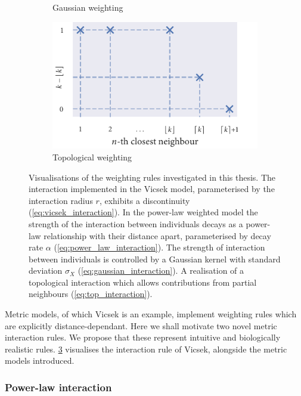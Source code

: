 \begin{figure}[tb]
\begin{subfigure}[b]{0.5\textwidth}
    \caption{Gaussian weighting}
    \label{fig:gauss_weight}
  \end{subfigure}%
  \begin{subfigure}[b]{0.5\textwidth}
    \includegraphics{topological_weighting.pdf}
    \caption{Topological weighting}
    \label{fig:top_weight}
  \end{subfigure}
  \caption{Visualisations of the weighting rules investigated in this thesis.
     The interaction implemented in the Vicsek model,
    parameterised by the interaction radius $r$, exhibits a discontinuity
    (\cref{eq:vicsek_interaction}).
     In the power-law weighted model the strength of
    the interaction between individuals decays as a power-law relationship with
    their distance apart, parameterised by decay rate $\alpha$
    (\cref{eq:power_law_interaction}).
     The
    strength of interaction between individuals is controlled by a Gaussian
    kernel with standard deviation $\sigma_X$
    (\cref{eq:gaussian_interaction}).
     A realisation of
    a topological interaction which allows contributions from partial neighbours
    (\cref{eq:top_interaction}).}
  \label{fig:weighting_rules}
\end{figure}

Metric models, of which Vicsek is an example, implement weighting rules which
are explicitly distance-dependant. Here we shall motivate two novel metric
interaction rules. We propose that these represent intuitive and biologically
realistic rules. \cref{fig:weighting_rules} visualises the interaction rule of
Vicsek, alongside the metric models introduced.

\subsubsection{Power-law interaction}

